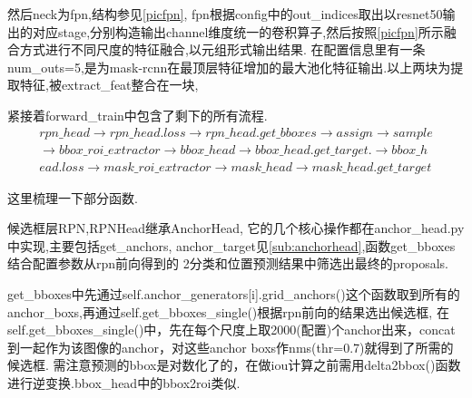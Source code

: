 \documentclass[UTF8]{ctexart}
\begin{document}
然后neck为fpn,结构参见\ref{picfpn},
fpn根据config中的out\_indices取出以resnet50输出的对应stage,分别构造输出channel维度统一的卷积算子,然后按照\ref{picfpn}所示融合方式进行不同尺度的特征融合,以元组形式输出结果.
在配置信息里有一条num\_outs=5,是为mask-rcnn在最顶层特征增加的最大池化特征输出.以上两块为提取特征,被extract\_feat整合在一块,



紧接着forward\_train中包含了剩下的所有流程.
\begin{equation*}
	\begin{aligned}
		 rpn\_head \rightarrow rpn\_head.loss \rightarrow rpn\_head.get\_bboxes \rightarrow assign \rightarrow sample \\
		\rightarrow bbox\_roi\_extractor \rightarrow  bbox\_head \rightarrow bbox\_head.get\_target. \rightarrow bbox\_h\\
		ead.loss \rightarrow mask\_roi\_extractor \rightarrow mask\_head \rightarrow mask\_head.get\_target
	\end{aligned}
\end{equation*} 

这里梳理一下部分函数.

候选框层RPN,RPNHead继承AnchorHead, 它的几个核心操作都在anchor\_head.py中实现,主要包括get\_anchors, anchor\_target见\ref{sub:anchorhead},函数get\_bboxes结合配置参数从rpn前向得到的
2分类和位置预测结果中筛选出最终的proposals.

get\_bboxes中先通过self.anchor\_generators[i].grid\_anchors()这个函数取到所有的anchor\_boxs,再通过self.get\_bboxes\_single()根据rpn前向的结果选出候选框,
在self.get\_bboxes\_single()中，先在每个尺度上取2000(配置)个anchor出来，concat到一起作为该图像的anchor，对这些anchor boxs作nms(thr=0.7)就得到了所需的候选框.
需注意预测的bbox是对数化了的，在做iou计算之前需用delta2bbox()函数进行逆变换.bbox\_head中的bbox2roi类似.
\end{document}
